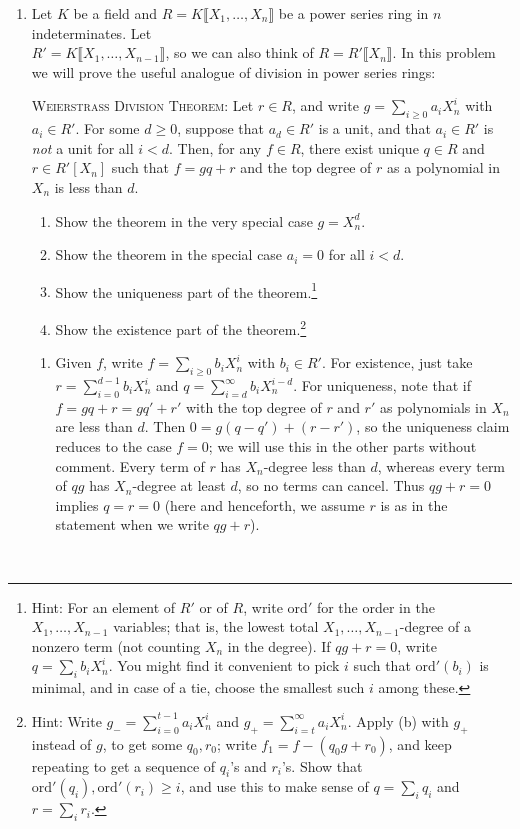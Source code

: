 \documentclass[12pt]{amsart}
\newcommand{\ord}{\mathrm{ord}}
\newcommand{\solution}[1]{\ifthenelse {\equal{\displaysol}{1}} {\begin{framed}{\color{meretale}\noindent #1}\end{framed}} { \ }}
\newcommand\itemC{\stepcounter{enumi}\item[{\it{(\theenumi)}}]}
\newcommand\itemc{\stepcounter{enumii}\item[{\it{(\theenumii)}}]}
\begin{document}
\begin{enumerate}
\itemC Let $K$ be a field and $R=K\llbracket X_1,\dots,X_n\rrbracket$ be a power series ring in $n$ indeterminates. Let \\${R'= K\llbracket X_1,\dots,X_{n-1}\rrbracket}$, so we can also think of $R=R'\llbracket X_{n}\rrbracket$.  In this problem we will prove the useful analogue of division in power series rings:

\vspace{3mm}

\noindent \textsc{Weierstrass Division Theorem:} Let $r\in R$, and write $g= \sum_{i\geq 0} a_i X_n^i$ with $a_i\in R'$. For some $d\geq 0$, suppose that $a_d\in R'$ is a unit, and that $a_i \in R'$ is \emph{not} a unit for all $i<d$. Then, for any $f\in R$, there exist unique $q\in R$ and $r\in R'[X_n]$ such that $f=gq+r$ and the top degree of $r$ as a polynomial in $X_n$ is less than $d$. 

\vspace{3mm}


\begin{enumerate}
\itemc Show the theorem in the very special case $g= X_n^d$.
\itemc Show the theorem in the special case $a_i=0$ for all $i<d$. 
\itemc Show the uniqueness part of the theorem.\footnote{Hint: For an element of $R'$ or of $R$, write $\ord'$ for the order in the $X_1,\dots,X_{n-1}$ variables; that is, the lowest total $X_1,\dots,X_{n-1}$-degree of a nonzero term (not counting $X_n$ in the degree). If $qg+r=0$, write $q=\sum_i b_i X_n^i$. You might find it convenient to pick $i$ such that $\ord'(b_i)$ is minimal, and in case of a tie, choose the smallest such $i$ among these.}
\itemc Show the existence part of the theorem.\footnote{Hint: Write $g_- = \sum_{i=0}^{t-1} a_i X_n^i$ and $g_+ = \sum_{i=t}^\infty a_i X_n^i$. Apply (b) with $g_+$ instead of $g$, to get some $q_0,r_0$; write $f_1=f-(q_0 g + r_0)$, and keep repeating to get a sequence of $q_i$'s and $r_i$'s. Show that $\ord'(q_i), \ord'(r_i) \geq i$, and use this to make sense of $q=\sum_i q_i$ and $r=\sum_i r_i$.}
\end{enumerate}

\solution{
\begin{enumerate}
\item Given $f$, write $f=\sum_{i\geq 0} b_i X_n^i$ with $b_i\in R'$. For existence, just take $r=\sum_{i=0}^{d-1} b_i X_n^i$ and $q=\sum_{i=d}^\infty b_i X_n^{i-d}$. For uniqueness, note that if $f=gq+r=gq'+r'$ with the top degree of $r$ and $r'$ as polynomials in $X_n$ are less than $d$. Then $0=g(q-q') + (r-r')$, so the uniqueness claim reduces to the case $f=0$; we will use this in the other parts without comment. Every term of $r$ has $X_n$-degree less than $d$, whereas every term of $qg$ has $X_n$-degree at least $d$, so no terms can cancel. Thus $qg+r=0$ implies $q=r=0$ (here and henceforth, we assume $r$ is as in the statement when we write $qg+r$).


\end{enumerate}}
\end{enumerate}
\end{document}
